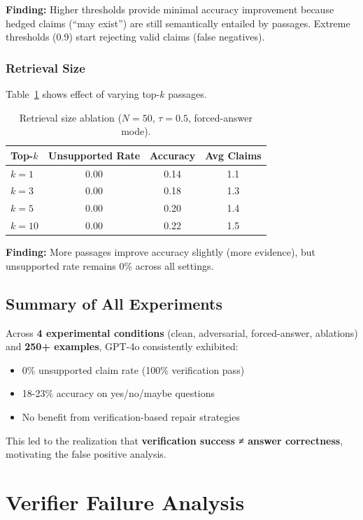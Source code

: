 \documentclass[11pt]{article}
\begin{document}
\textbf{Finding:} Higher thresholds provide minimal accuracy improvement because hedged claims (``may exist'') are still semantically entailed by passages. Extreme thresholds (0.9) start rejecting valid claims (false negatives).

\subsubsection{Retrieval Size}

Table~\ref{tab:k_ablation} shows effect of varying top-$k$ passages.

\begin{table}[h]
\centering
\caption{Retrieval size ablation ($N=50$, $\tau=0.5$, forced-answer mode).}
\label{tab:k_ablation}
\begin{tabular}{lccc}
\toprule
\textbf{Top-$k$} & \textbf{Unsupported Rate} & \textbf{Accuracy} & \textbf{Avg Claims} \\
\midrule
$k=1$ & 0.00 & 0.14 & 1.1 \\
$k=3$ & 0.00 & 0.18 & 1.3 \\
$k=5$ & 0.00 & 0.20 & 1.4 \\
$k=10$ & 0.00 & 0.22 & 1.5 \\
\bottomrule
\end{tabular}
\end{table}

\textbf{Finding:} More passages improve accuracy slightly (more evidence), but unsupported rate remains 0\% across all settings.

\subsection{Summary of All Experiments}

Across \textbf{4 experimental conditions} (clean, adversarial, forced-answer, ablations) and \textbf{250+ examples}, GPT-4o consistently exhibited:
\begin{itemize}
\item 0\% unsupported claim rate (100\% verification pass)
\item 18-23\% accuracy on yes/no/maybe questions
\item No benefit from verification-based repair strategies
\end{itemize}

This led to the realization that \textbf{verification success ≠ answer correctness}, motivating the false positive analysis.

\section{Verifier Failure Analysis}
\end{document}
